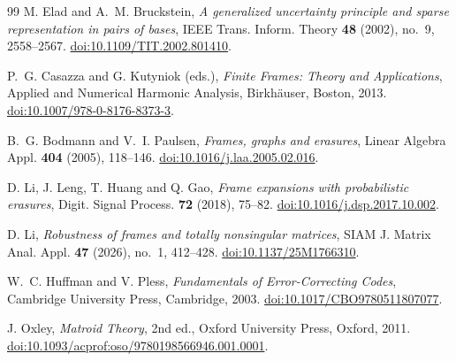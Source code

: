 \documentclass[11pt]{article}
\begin{document}
\begin{thebibliography}{99}
M. Elad and A.~M. Bruckstein,
\emph{A generalized uncertainty principle and sparse representation in pairs of bases},
IEEE Trans. Inform. Theory \textbf{48} (2002), no.~9, 2558--2567.
\href{https://doi.org/10.1109/TIT.2002.801410}{doi:10.1109/TIT.2002.801410}.

P.~G. Casazza and G. Kutyniok (eds.),
\emph{Finite Frames: Theory and Applications},
Applied and Numerical Harmonic Analysis, Birkh\"auser, Boston, 2013.
\href{https://doi.org/10.1007/978-0-8176-8373-3}{doi:10.1007/978-0-8176-8373-3}.

B.~G. Bodmann and V.~I. Paulsen,
\emph{Frames, graphs and erasures},
Linear Algebra Appl. \textbf{404} (2005), 118--146.
\href{https://doi.org/10.1016/j.laa.2005.02.016}{doi:10.1016/j.laa.2005.02.016}.

D. Li, J. Leng, T. Huang and Q. Gao,
\emph{Frame expansions with probabilistic erasures},
Digit. Signal Process. \textbf{72} (2018), 75--82.
\href{https://doi.org/10.1016/j.dsp.2017.10.002}{doi:10.1016/j.dsp.2017.10.002}.

D. Li,
\emph{Robustness of frames and totally nonsingular matrices},
SIAM J. Matrix Anal. Appl. \textbf{47} (2026), no.~1, 412--428.
\href{https://doi.org/10.1137/25M1766310}{doi:10.1137/25M1766310}.

W.~C. Huffman and V. Pless,
\emph{Fundamentals of Error-Correcting Codes},
Cambridge University Press, Cambridge, 2003.
\href{https://doi.org/10.1017/CBO9780511807077}{doi:10.1017/CBO9780511807077}.

J. Oxley,
\emph{Matroid Theory}, 2nd ed.,
Oxford University Press, Oxford, 2011.
\href{https://doi.org/10.1093/acprof:oso/9780198566946.001.0001}{doi:10.1093/acprof:oso/9780198566946.001.0001}.

\end{thebibliography}
\end{document}
